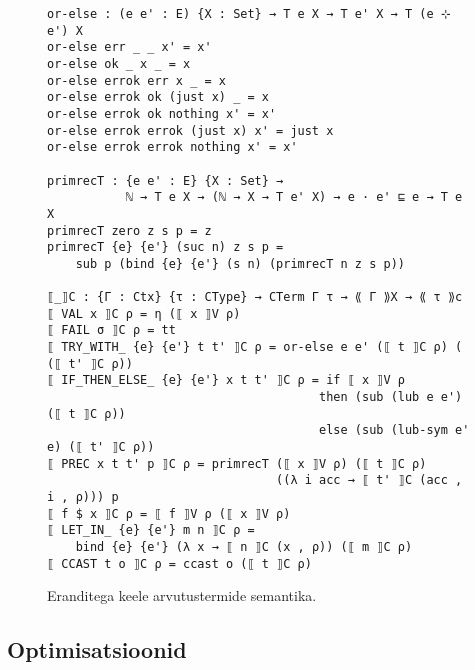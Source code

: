 \documentclass[a4paper,12pt]{article}
\begin{document}
\begin{figure}
  \begin{BVerbatim}
or-else : (e e' : E) {X : Set} → T e X → T e' X → T (e ⊹ e') X
or-else err _ _ x' = x'
or-else ok _ x _ = x
or-else errok err x _ = x
or-else errok ok (just x) _ = x
or-else errok ok nothing x' = x'
or-else errok errok (just x) x' = just x
or-else errok errok nothing x' = x'

primrecT : {e e' : E} {X : Set} →
           ℕ → T e X → (ℕ → X → T e' X) → e · e' ⊑ e → T e X
primrecT zero z s p = z
primrecT {e} {e'} (suc n) z s p =
    sub p (bind {e} {e'} (s n) (primrecT n z s p))

⟦_⟧C : {Γ : Ctx} {τ : CType} → CTerm Γ τ → ⟪ Γ ⟫X → ⟪ τ ⟫c
⟦ VAL x ⟧C ρ = η (⟦ x ⟧V ρ)
⟦ FAIL σ ⟧C ρ = tt
⟦ TRY_WITH_ {e} {e'} t t' ⟧C ρ = or-else e e' (⟦ t ⟧C ρ) ( (⟦ t' ⟧C ρ))
⟦ IF_THEN_ELSE_ {e} {e'} x t t' ⟧C ρ = if ⟦ x ⟧V ρ
                                      then (sub (lub e e') (⟦ t ⟧C ρ))
                                      else (sub (lub-sym e' e) (⟦ t' ⟧C ρ))
⟦ PREC x t t' p ⟧C ρ = primrecT (⟦ x ⟧V ρ) (⟦ t ⟧C ρ)
                                ((λ i acc → ⟦ t' ⟧C (acc , i , ρ))) p
⟦ f $ x ⟧C ρ = ⟦ f ⟧V ρ (⟦ x ⟧V ρ)
⟦ LET_IN_ {e} {e'} m n ⟧C ρ =
    bind {e} {e'} (λ x → ⟦ n ⟧C (x , ρ)) (⟦ m ⟧C ρ)
⟦ CCAST t o ⟧C ρ = ccast o (⟦ t ⟧C ρ)
  \end{BVerbatim}
  \caption{Eranditega keele arvutustermide semantika.}
  \label{fig:exc.cterm-semantics}
\end{figure}

\subsection{Optimisatsioonid}\label{ssec:exc.optimizations}
\end{document}
